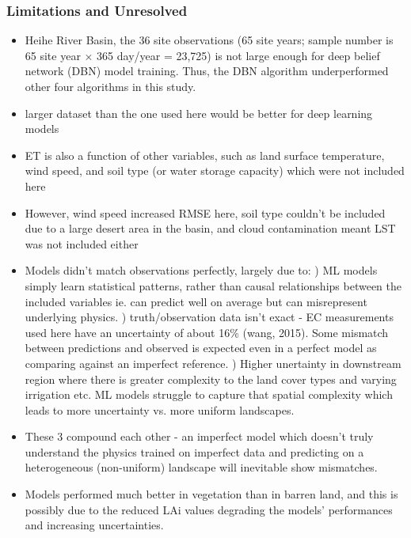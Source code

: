 \documentclass[paper=a4, fontsize=12pt]{scrartcl}
\begin{document}
	\subsubsection*{Limitations and Unresolved}
	\begin{itemize}
		\item Heihe River Basin, the 36 site observations (65 site years; sample number is 65 site year × 365 day/year = 23,725) is not large enough for deep belief network (DBN) model training. Thus, the DBN algorithm underperformed other four algorithms in this study.
		\item larger dataset than the one used here would be better for deep learning models  
		\item ET is also a function of other variables, such as land surface temperature, wind speed, and soil type (or water storage capacity) which were not included here 
		\item However, wind speed increased RMSE here, soil type couldn't be included due to a large desert area in the basin, and cloud contamination meant  LST was not included either
		\item Models didn't match observations perfectly, largely due to: ) ML models simply learn statistical patterns, rather than causal relationships between the included variables ie. can predict well on average but can misrepresent underlying physics. ) truth/observation data isn't exact - EC measurements used here have an uncertainty of about 16\% (wang, 2015). Some mismatch between predictions and observed is expected even in a perfect model as comparing against an imperfect reference. ) Higher unertainty in downstream region where there is greater complexity to the land cover types and varying irrigation etc. ML models struggle to capture that spatial complexity which leads to more uncertainty vs. more uniform landscapes.
		\item These 3 compound each other - an imperfect model which doesn't truly understand the physics trained on imperfect data and predicting on a heterogeneous (non-uniform) landscape will inevitable show mismatches.
		\item Models performed much better in vegetation than in barren land, and this is possibly due to the reduced LAi values degrading the models' performances and increasing uncertainties.
	\end{itemize}
	
\end{document}
